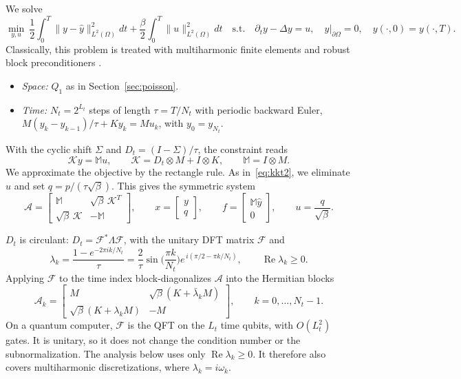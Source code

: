 \documentclass[11pt,a4paper]{article}
\newcommand{\A}{\mathcal{A}}
\theoremstyle{remark}
\begin{document}
We solve
\begin{equation}\label{eq:heatocp}
\min_{y,u}\ \frac12\int_0^T\!\!\|y-\hat y\|_{L^2(\Omega)}^2dt+\frac\beta2\int_0^T\!\!\|u\|_{L^2(\Omega)}^2dt
\quad\text{s.t.}\quad \partial_ty-\Delta y=u,\quad y|_{\partial\Omega}=0,\quad y(\cdot,0)=y(\cdot,T).
\end{equation}
Classically, this problem is treated with multiharmonic finite elements and
robust block preconditioners \cite{KK12,KKLWZ13}.
\begin{itemize}
\item \emph{Space:} $Q_1$ as in Section~\ref{sec:poisson}.
\item \emph{Time:} $N_t=2^{L_t}$ steps of length $\tau=T/N_t$ with periodic
  backward Euler, $M(y_k-y_{k-1})/\tau+Ky_k=Mu_k$, with $y_0=y_{N_t}$.
\end{itemize}
With the cyclic shift $\Sigma$ and $D_t=(I-\Sigma)/\tau$, the constraint reads
\[
\mathcal Ky=\mathbb Mu,\qquad \mathcal K=D_t\otimes M+I\otimes K,\qquad \mathbb M=I\otimes M .
\]
We approximate the objective by the rectangle rule. As
in~\eqref{eq:kkt2}, we eliminate $u$ and set $q=p/(\tau\sqrt\beta)$. This
gives the symmetric system
\begin{equation}\label{eq:heatkkt}
\A=\begin{bmatrix}\mathbb M & \sqrt\beta\,\mathcal K^T\\ \sqrt\beta\,\mathcal K & -\mathbb M\end{bmatrix},\qquad
x=\begin{bmatrix}y\\ q\end{bmatrix},\qquad f=\begin{bmatrix}\mathbb M\hat y\\ 0\end{bmatrix},\qquad
u=\frac{q}{\sqrt\beta}.
\end{equation}

$D_t$ is circulant: $D_t=\mathcal F^*\Lambda\mathcal F$, with the unitary DFT matrix $\mathcal F$
and
\begin{equation}\label{eq:lamk}
\lambda_k=\frac{1-e^{-2\pi ik/N_t}}{\tau}=\frac2\tau\sin\Big(\frac{\pi k}{N_t}\Big)e^{\,i(\pi/2-\pi k/N_t)},
\qquad\operatorname{Re}\lambda_k\ge0 .
\end{equation}
Applying $\mathcal F$ to the time index block-diagonalizes $\A$ into the Hermitian
blocks
\begin{equation}\label{eq:Ak}
\A_k=\begin{bmatrix}M & \sqrt\beta(K+\bar\lambda_kM)\\ \sqrt\beta(K+\lambda_kM) & -M\end{bmatrix},\qquad k=0,\dots,N_t-1 .
\end{equation}
On a quantum computer, $\mathcal F$ is the QFT on the $L_t$ time qubits, with
$O(L_t^2)$ gates. It is unitary, so it does not change the condition number
or the subnormalization. The analysis below uses only $\operatorname{Re}\lambda_k\ge0$. It
therefore also covers multiharmonic discretizations, where $\lambda_k=i\omega_k$.
\end{document}
